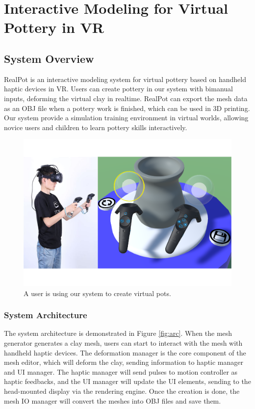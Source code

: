 \documentclass{svjour3}                     %
\begin{document}
\section{Interactive Modeling for Virtual Pottery in VR}
\label{sec:interactive}


\subsection{System Overview}
\label{sec:overview}
RealPot is an interactive modeling system for virtual pottery based on handheld haptic devices in VR.
Users can create pottery in our system with bimanual inputs, deforming the virtual clay in realtime.
RealPot can export the mesh data as an OBJ file when a pottery work is finished, which can be used in 3D printing.
Our system provide a simulation training environment in virtual worlds, allowing novice users and children to learn pottery skills interactively.

\begin{figure}
\includegraphics[width=\textwidth]{fig1}
\caption{A user is using our system to create virtual pots.}
\label{fig:demo}
\end{figure}

\subsubsection{System Architecture}
\label{sec:architecture}

The system architecture is demonstrated in Figure \ref{fig:arc}. When the mesh generator generates a clay mesh, users can start to interact with the mesh with handheld haptic devices. The deformation manager is the core component of the mesh editor, which will deform the clay, sending information to haptic manager and UI manager. The haptic manager will send pulses to motion controller as haptic feedbacks, and the UI manager will update the UI elements, sending to the head-mounted display via the rendering engine. Once the creation is done, the mesh IO manager will convert the meshes into OBJ files and save them.
\end{document}
